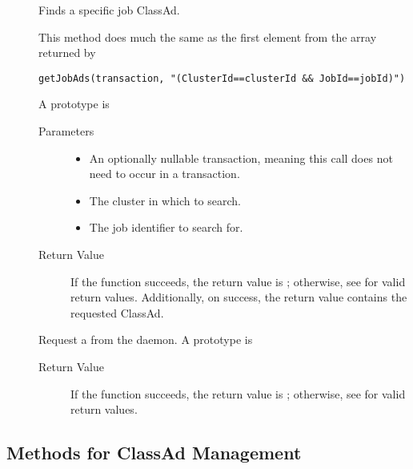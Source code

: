 \begin{description}
\item []
  Finds a specific job ClassAd. 

  This method does much the same as the first element from the array 
  returned by

\footnotesize
\begin{verbatim}
getJobAds(transaction, "(ClusterId==clusterId && JobId==jobId)")
\end{verbatim}
\normalsize

  A prototype is 


  \begin{description}
    \item[ Parameters]
    \begin{itemize}
      \item {} 
      An optionally nullable transaction, meaning this call does not 
      need to occur in a transaction. 
      \item {} The cluster in which to search.
      \item {} The job identifier to search for.
    \end{itemize}
    \item[ Return Value]
      If the function succeeds, the return value is ; 
      otherwise, see  for valid return values. Additionally,
      on success, the return value contains the requested ClassAd.
  \end{description}


\item []
  Request a  from the  daemon.
  A prototype is 


  \begin{description}
    \item[ Return Value]
      If the function succeeds, the return value is ; 
      otherwise, see  for valid return values.
  \end{description} 

   
\end{description}

\subsection{\label{WebService-ClassAdManagement} Methods for ClassAd Management}

